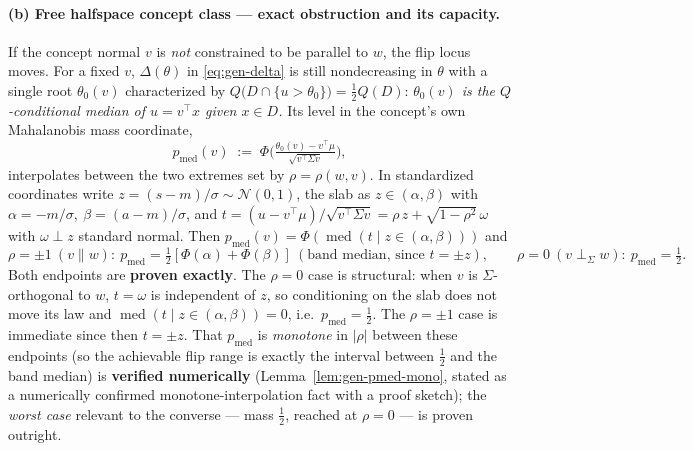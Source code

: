 \paragraph{(b) Free halfspace concept class --- exact obstruction and its capacity.}
If the concept normal $v$ is \emph{not} constrained to be parallel to $w$, the flip
locus moves. For a fixed $v$, $\Delta(\theta)$ in \eqref{eq:gen-delta} is still
nondecreasing in $\theta$ with a single root $\theta_0(v)$ characterized by
$Q\big(D\cap\{u>\theta_0\}\big)=\tfrac12 Q(D)$: \emph{$\theta_0(v)$ is the
$Q$-conditional median of $u=v^\top x$ given $x\in D$.} Its level in the concept's
own Mahalanobis mass coordinate,
\begin{equation}\label{eq:gen-pmed}
  p_{\mathrm{med}}(v)\;:=\;\Phi\!\Big(\tfrac{\theta_0(v)-v^\top\mu}{\sqrt{v^\top\Sigma v}}\Big),
\end{equation}
interpolates between the two extremes set by $\rho=\rho(w,v)$. In standardized
coordinates write $z=(s-m)/\sigma\sim\mathcal N(0,1)$, the slab as $z\in(\alpha,\beta)$
with $\alpha=-m/\sigma,\ \beta=(a-m)/\sigma$, and
$t=(u-v^\top\mu)/\sqrt{v^\top\Sigma v}=\rho\,z+\sqrt{1-\rho^2}\,\omega$ with
$\omega\perp z$ standard normal. Then $p_{\mathrm{med}}(v)=\Phi(\operatorname{med}(t\mid z\in(\alpha,\beta)))$ and
\begin{equation}\label{eq:gen-pmed-range}
  \rho=\pm1\ (v\parallel w):\ p_{\mathrm{med}}=
  \tfrac12[\Phi(\alpha)+\Phi(\beta)]\ (\text{band median, since }t=\pm z),
  \qquad
  \rho=0\ (v\perp_\Sigma w):\ p_{\mathrm{med}}=\tfrac12.
\end{equation}
Both endpoints are \textbf{proven exactly}. The $\rho=0$ case is structural: when $v$ is
$\Sigma$-orthogonal to $w$, $t=\omega$ is independent of $z$, so conditioning on the
slab does not move its law and $\operatorname{med}(t\mid z\in(\alpha,\beta))=0$, i.e.\
$p_{\mathrm{med}}=\tfrac12$. The $\rho=\pm1$ case is immediate since then $t=\pm z$. That
$p_{\mathrm{med}}$ is \emph{monotone} in $|\rho|$ between these endpoints (so the
achievable flip range is exactly the interval between $\tfrac12$ and the band median) is
\textbf{verified numerically} (Lemma~\ref{lem:gen-pmed-mono}, stated as a numerically
confirmed monotone-interpolation fact with a proof sketch); the \emph{worst case}
relevant to the converse --- mass $\tfrac12$, reached at $\rho=0$ --- is proven outright.

